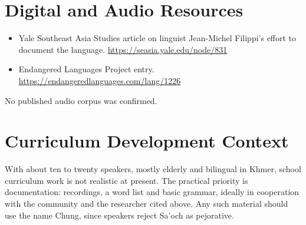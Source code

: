 \documentclass[12pt]{article}
\begin{document}
\section{Digital and Audio Resources}
\begin{itemize}
\item Yale Southeast Asia Studies article on linguist Jean-Michel Filippi's effort to document the language. \url{https://seasia.yale.edu/node/831}
\item Endangered Languages Project entry. \url{https://endangeredlanguages.com/lang/1226}
\end{itemize}
No published audio corpus was confirmed.

\section{Curriculum Development Context}
With about ten to twenty speakers, mostly elderly and bilingual in Khmer, school curriculum work is not realistic at present. The practical priority is documentation: recordings, a word list and basic grammar, ideally in cooperation with the community and the researcher cited above. Any such material should use the name Chung, since speakers reject Sa'och as pejorative.
\end{document}

